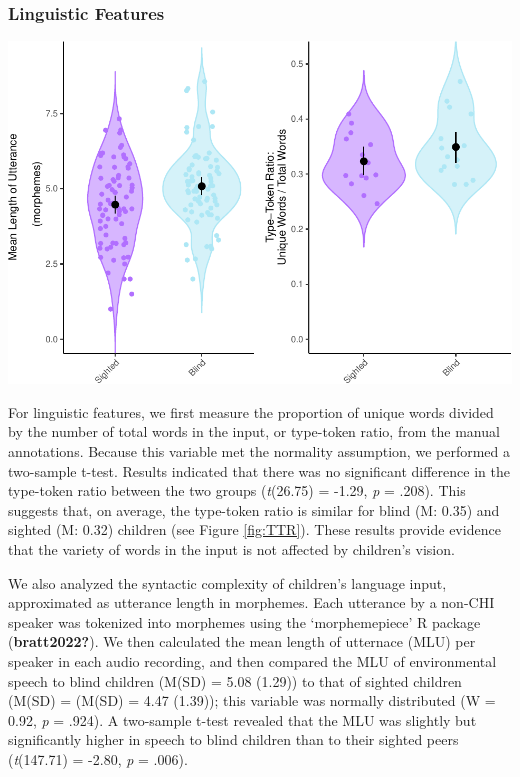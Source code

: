 \documentclass[
  man,floatsintext]{apa6}
\begin{document}
\hypertarget{linguistic-features}{%
\subsubsection{Linguistic Features}\label{linguistic-features}}

\includegraphics{input_quality_manuscript_files/figure-latex/linguistic-plots-1.pdf}

For linguistic features, we first measure the proportion of unique words divided by the number of total words in the input, or type-token ratio, from the manual annotations. Because this variable met the normality assumption, we performed a two-sample t-test. Results indicated that there was no significant difference in the type-token ratio between the two groups (\emph{t}(26.75) = -1.29, \emph{p} = .208). This suggests that, on average, the type-token ratio is similar for blind (M: 0.35) and sighted (M: 0.32) children (see Figure \ref{fig:TTR}). These results provide evidence that the variety of words in the input is not affected by children's vision.

We also analyzed the syntactic complexity of children's language input, approximated as utterance length in morphemes. Each utterance by a non-CHI speaker was tokenized into morphemes using the `morphemepiece' R package (\textbf{bratt2022?}). We then calculated the mean length of utternace (MLU) per speaker in each audio recording, and then compared the MLU of environmental speech to blind children (M(SD) = 5.08 (1.29)) to that of sighted children (M(SD) = (M(SD) = 4.47 (1.39)); this variable was normally distributed (W = 0.92, \emph{p} = .924). A two-sample t-test revealed that the MLU was slightly but significantly higher in speech to blind children than to their sighted peers (\emph{t}(147.71) = -2.80, \emph{p} = .006).
\end{document}
